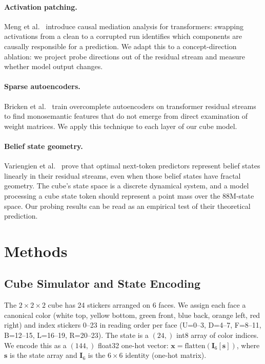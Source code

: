\documentclass[12pt]{article}
\begin{document}
\paragraph{Activation patching.}
Meng et al.\ \cite{meng2022locatingfactual} introduce causal mediation analysis
for transformers: swapping activations from a clean to a corrupted run identifies
which components are causally responsible for a prediction.  We adapt this to a
concept-direction ablation: we project probe directions out of the residual stream
and measure whether model output changes.

\paragraph{Sparse autoencoders.}
Bricken et al.\ \cite{bricken2023monosemantic} train overcomplete autoencoders
on transformer residual streams to find monosemantic features that do not emerge
from direct examination of weight matrices.  We apply this technique to each
layer of our cube model.

\paragraph{Belief state geometry.}
Variengien et al.\ \cite{variengien2024beliefstate} prove that optimal
next-token predictors represent belief states linearly in their residual streams,
even when those belief states have fractal geometry.  The cube's state space is a
discrete dynamical system, and a model processing a cube state token should
represent a point mass over the 88M-state space.  Our probing results can
be read as an empirical test of their theoretical prediction.

\section{Methods}

\subsection{Cube Simulator and State Encoding}

The $2{\times}2{\times}2$ cube has 24 stickers arranged on 6 faces.  We assign each
face a canonical color (white top, yellow bottom, green front, blue back, orange
left, red right) and index stickers 0--23 in reading order per face (U=0--3,
D=4--7, F=8--11, B=12--15, L=16--19, R=20--23).  The state is a
$(24,)$ int8 array of color indices.  We encode this as a $(144,)$ float32
one-hot vector: $\mathbf{x} = \text{flatten}(\mathbf{I}_6[\mathbf{s}])$, where
$\mathbf{s}$ is the state array and $\mathbf{I}_6$ is the $6 \times 6$ identity
(one-hot matrix).
\end{document}
